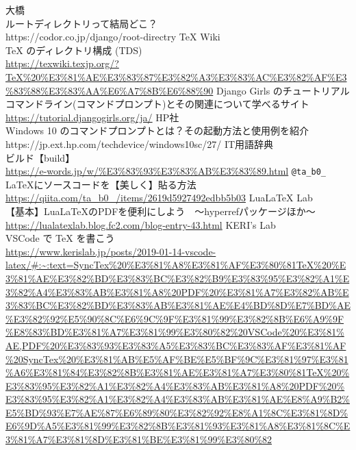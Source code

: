 \documentclass{ltjsarticle}
\begin{document}
\begin{thebibliography}{999}
  大橋\\
  ルートディレクトリって結局どこ？\\
  https://codor.co.jp/django/root-directry
  TeX Wiki\\
  TeX のディレクトリ構成 (TDS) \\
  \url{https://texwiki.texjp.org/?TeX%20%E3%81%AE%E3%83%87%E3%82%A3%E3%83%AC%E3%82%AF%E3%83%88%E3%83%AA%E6%A7%8B%E6%88%90}
  Django Girls のチュートリアル\\
  コマンドライン(コマンドプロンプト)とその関連について学べるサイト\\
  \url{https://tutorial.djangogirls.org/ja/}
  HP社\\
  Windows 10 のコマンドプロンプトとは？その起動方法と使用例を紹介\\
  https://jp.ext.hp.com/techdevice/windows10sc/27/
  IT用語辞典\\
  ビルド【build】\\
  \url{https://e-words.jp/w/%E3%83%93%E3%83%AB%E3%83%89.html}
  \verb|@ta_b0_|\\
  LaTeXにソースコードを【美しく】貼る方法\\
  \url{https://qiita.com/ta_b0_/items/2619d5927492edbb5b03}
  LuaLaTeX Lab\\
  【基本】LuaLaTeXのPDFを便利にしよう　～hyperrefパッケージほか～\\
  \url{https://lualatexlab.blog.fc2.com/blog-entry-43.html}
  KERI's Lab\\
  VSCode で TeX を書こう\\
  \url{https://www.kerislab.jp/posts/2019-01-14-vscode-latex/#:~:text=SyncTex%20%E3%81%A8%E3%81%AF%E3%80%81TeX%20%E3%81%AE%E3%82%BD%E3%83%BC%E3%82%B9%E3%83%95%E3%82%A1%E3%82%A4%E3%83%AB%E3%81%A8%20PDF%20%E3%81%A7%E3%82%AB%E3%83%BC%E3%82%BD%E3%83%AB%E3%81%AE%E4%BD%8D%E7%BD%AE%E3%82%92%E5%90%8C%E6%9C%9F%E3%81%99%E3%82%8B%E6%A9%9F%E8%83%BD%E3%81%A7%E3%81%99%E3%80%82%20VSCode%20%E3%81%AE,PDF%20%E3%83%93%E3%83%A5%E3%83%BC%E3%83%AF%E3%81%AF%20SyncTex%20%E3%81%AB%E5%AF%BE%E5%BF%9C%E3%81%97%E3%81%A6%E3%81%84%E3%82%8B%E3%81%AE%E3%81%A7%E3%80%81TeX%20%E3%83%95%E3%82%A1%E3%82%A4%E3%83%AB%E3%81%A8%20PDF%20%E3%83%95%E3%82%A1%E3%82%A4%E3%83%AB%E3%81%AE%E8%A9%B2%E5%BD%93%E7%AE%87%E6%89%80%E3%82%92%E8%A1%8C%E3%81%8D%E6%9D%A5%E3%81%99%E3%82%8B%E3%81%93%E3%81%A8%E3%81%8C%E3%81%A7%E3%81%8D%E3%81%BE%E3%81%99%E3%80%82}

\end{thebibliography}
\end{document}
